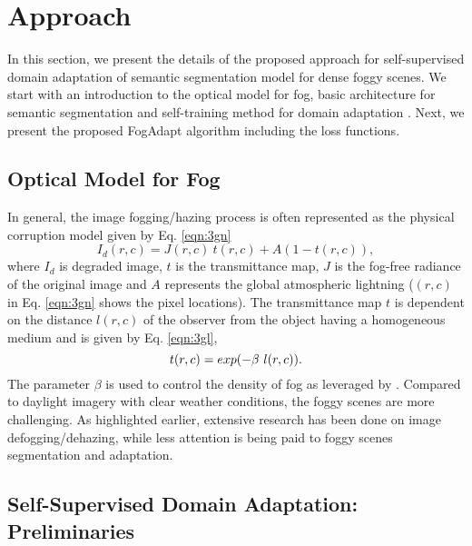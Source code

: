 \documentclass[final,5p,times,twocolumn]{elsarticle}
\begin{document}
\section{Approach}
\label{sec:method}
In this section, we present the details of the proposed approach for self-supervised domain adaptation of semantic segmentation model for dense foggy scenes. 
We start with an introduction to the optical model for fog, basic architecture for semantic segmentation \cite{wu2019Resnet38} and self-training method for domain adaptation \cite{zou2018unsupervised, mlsl2020}. 
Next, we present the proposed FogAdapt algorithm including the loss functions. 


\subsection{Optical Model for Fog}

In general, the image fogging/hazing process is often represented as the physical corruption model given by Eq. \ref{eqn:3gn} \cite{sakaridis2018semantic}
\begin{equation}
I_d (r, c) = J(r, c) ~ t(r, c) + A(1 - t(r, c)),
\label{eqn:3gn}
\end{equation}
where $I_d$ is degraded image, $t$ is the transmittance map, $J$ is the fog-free radiance of the original image and $A$ represents the global atmospheric lightning ($(r, c)$ in Eq. \ref{eqn:3gn} shows the pixel locations). The transmittance map $t$ is dependent on the distance $l(r, c)$ of the observer from the object having a homogeneous medium and is given by Eq. \ref{eqn:3gl},
\begin{equation}
\centering
t(r, c) = exp(-\beta~l(r, c)).
\label{eqn:3gl}
\end{equation}
The parameter $\beta$ is used to control the density of fog as leveraged by \cite{sakaridis2018semantic}. Compared to daylight imagery with clear weather conditions, the foggy scenes are more challenging. 
As highlighted earlier, extensive research has been done on image defogging/dehazing, while less attention is being paid to foggy scenes segmentation and adaptation.

\subsection{Self-Supervised Domain Adaptation: Preliminaries}
\end{document}
